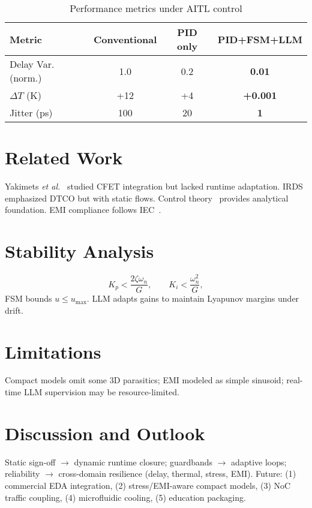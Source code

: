 \documentclass[conference]{IEEEtran}
\begin{document}
\begin{table}[t]
\caption{Performance metrics under AITL control}
\label{tab:perf}
\centering
\begin{tabular}{lccc}
\hline
Metric & Conventional & PID only & PID+FSM+LLM \\
\hline
Delay Var. (norm.) & 1.0 & 0.2 & \textbf{0.01} \\
$\Delta T$ (K)     & +12 & +4  & \textbf{+0.001} \\
Jitter (ps)        & 100 & 20  & \textbf{1} \\
\hline
\end{tabular}
\end{table}

\section{Related Work}
Yakimets \emph{et al.}~\cite{yakimets2020} studied CFET integration but lacked runtime adaptation. IRDS~\cite{irds2023} emphasized DTCO but with static flows. Control theory~\cite{franklin2015,anderson2007,khalil2002} provides analytical foundation. EMI compliance follows IEC~\cite{iec2019}.

\section{Stability Analysis}
\begin{equation}
K_p<\frac{2\zeta\omega_n}{G},\qquad K_i<\frac{\omega_n^2}{G},
\end{equation}
FSM bounds $u\!\le\!u_{\max}$. LLM adapts gains to maintain Lyapunov margins under drift.

\section{Limitations}
Compact models omit some 3D parasitics; EMI modeled as simple sinusoid; real-time LLM supervision may be resource-limited.

\section{Discussion and Outlook}
Static sign-off $\rightarrow$ dynamic runtime closure; guardbands $\rightarrow$ adaptive loops; reliability $\rightarrow$ cross-domain resilience (delay, thermal, stress, EMI). Future: (1) commercial EDA integration, (2) stress/EMI-aware compact models, (3) NoC traffic coupling, (4) microfluidic cooling, (5) education packaging.
\end{document}
